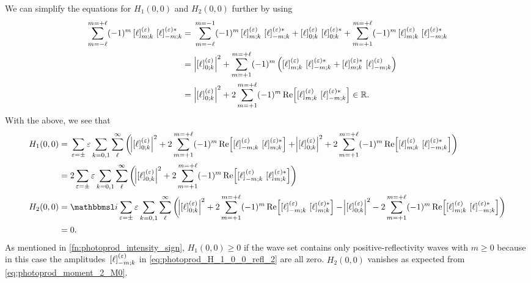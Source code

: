 We can simplify the equations for $H_1(0, 0)$ and $H_2(0, 0)$ further
by using
\begin{align}
  \sum_{m = -\ell}^{m = +\ell}
  (-1)^m \sBrk{\ell}^{(\refl)}_{m; k}\, \sBrk{\ell}^{(\refl) *}_{{-m}; k}
  ={}& \sum_{m = -\ell}^{m = -1}
  (-1)^m \sBrk{\ell}^{(\refl)}_{m; k}\, \sBrk{\ell}^{(\refl) *}_{{-m}; k}
  + \sBrk{\ell}^{(\refl)}_{0; k}\, \sBrk{\ell}^{(\refl) *}_{0; k}
  + \sum_{m = +1}^{m = +\ell}
  (-1)^m \sBrk{\ell}^{(\refl)}_{m; k}\, \sBrk{\ell}^{(\refl) *}_{{-m}; k} \nonumber
  \\
  ={}& \Abs[2]{\sBrk{\ell}^{(\refl)}_{0; k}}^2
  + \sum_{m = +1}^{m = +\ell}
  (-1)^m \rBrk[2]{\sBrk{\ell}^{(\refl)}_{m; k}\, \sBrk{\ell}^{(\refl) *}_{{-m}; k} + \sBrk{\ell}^{(\refl) *}_{m; k}\, \sBrk{\ell}^{(\refl)}_{{-m}; k}} \nonumber
  \\
  ={}& \Abs[2]{\sBrk{\ell}^{(\refl)}_{0; k}}^2
  + 2 \sum_{m = +1}^{m = +\ell}
  (-1)^m \Re[2]{\sBrk{\ell}^{(\refl)}_{m; k}\, \sBrk{\ell}^{(\refl) *}_{{-m}; k}}
  \in \mathbb{R}.
\end{align}
With the above, we see that
\begin{align}
  H_1(0, 0)
  ={}& \sum_{\refl = \pm} \refl \sum_{k = 0, 1} \sum_{\ell}^\infty
  \rBrk[3]{\Abs[2]{\sBrk{\ell}^{(\refl)}_{0; k}}^2
  + 2 \sum_{m = +1}^{m = +\ell}
  (-1)^m \Re[2]{\sBrk{\ell}^{(\refl)}_{{-m}; k}\, \sBrk{\ell}^{(\refl) *}_{m; k}}
  + \Abs[2]{\sBrk{\ell}^{(\refl)}_{0; k}}^2
  + 2 \sum_{m = +1}^{m = +\ell}
  (-1)^m \Re[2]{\sBrk{\ell}^{(\refl)}_{m; k}\, \sBrk{\ell}^{(\refl) *}_{{-m}; k}}} \nonumber
  \\
  \label{eq:photoprod_H_1_0_0_refl_2}
  ={}& 2 \sum_{\refl = \pm} \refl \sum_{k = 0, 1} \sum_{\ell}^\infty
  \rBrk[3]{\Abs[2]{\sBrk{\ell}^{(\refl)}_{0; k}}^2
  + 2 \sum_{m = +1}^{m = +\ell}
  (-1)^m \Re[2]{\sBrk{\ell}^{(\refl)}_{{-m}; k}\, \sBrk{\ell}^{(\refl) *}_{m; k}}}
  \\
  H_2(0, 0)
  ={}& \imag \sum_{\refl = \pm} \refl \sum_{k = 0, 1} \sum_{\ell}^\infty
  \rBrk[3]{\Abs[2]{\sBrk{\ell}^{(\refl)}_{0; k}}^2
  + 2 \sum_{m = +1}^{m = +\ell}
  (-1)^m \Re[2]{\sBrk{\ell}^{(\refl)}_{{-m}; k}\, \sBrk{\ell}^{(\refl) *}_{m; k}}
  - \Abs[2]{\sBrk{\ell}^{(\refl)}_{0; k}}^2
  - 2 \sum_{m = +1}^{m = +\ell}
  (-1)^m \Re[2]{\sBrk{\ell}^{(\refl)}_{m; k}\, \sBrk{\ell}^{(\refl) *}_{{-m}; k}}} \nonumber
  \\
  ={}& 0.
\end{align}
As mentioned in \cref{fn:photoprod_intensity_sign}, $H_1(0, 0) \geq 0$
if the wave set contains only positive-reflectivity waves with $m \geq
0$ because in this case the amplitudes~$\sBrk{\ell}^{(\refl)}_{{-m}; k}$ in
\cref{eq:photoprod_H_1_0_0_refl_2} are all zero.  $H_2(0, 0)$ vanishes
as expected from \cref{eq:photoprod_moment_2_M0}.


